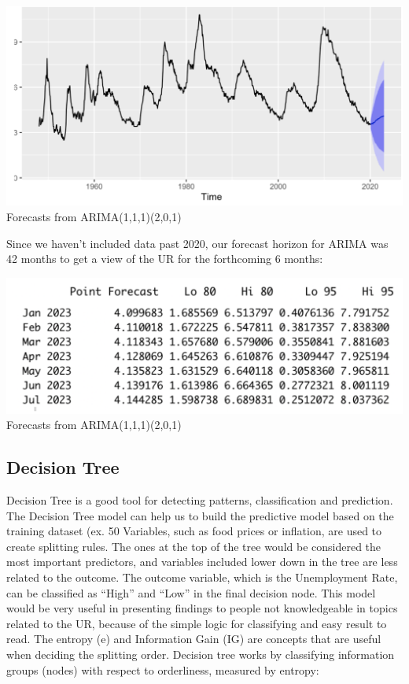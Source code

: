 \documentclass{article}
\begin{document}
		\begin{center}
			\includegraphics[width=1\textwidth]{assets/arima2.png}
			{Forecasts from ARIMA(1,1,1)(2,0,1) }
		\end{center}
		Since we haven’t included data past 2020, our forecast horizon for ARIMA was 42 months to get a view of the UR for the forthcoming 6 months:
		\begin{center}
			\includegraphics[width=1\textwidth]{assets/arima3.png}
			{Forecasts from ARIMA(1,1,1)(2,0,1) }
		\end{center}
	\subsection{Decision Tree}
	Decision Tree is a good tool for detecting patterns, classification and prediction. The Decision Tree model can help us to build the predictive model based on the training dataset (ex. 50%
	Variables, such as food prices or inflation, are used to create splitting rules. The ones at the top of the tree would be considered the most important predictors, and variables included lower down in the tree are less related to the outcome. The outcome variable, which is the Unemployment Rate, can be classified as “High” and “Low” in the final decision node.
	This model would be very useful in presenting findings to people not knowledgeable in topics related to the UR, because of the simple logic for classifying and easy result to read. The entropy (e) and Information Gain (IG) are concepts that are useful when deciding the splitting order. Decision tree works by classifying information groups (nodes) with respect to orderliness, measured by entropy:
	
\end{document}

